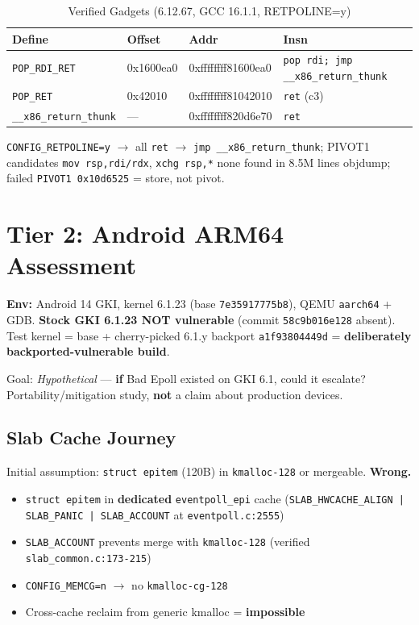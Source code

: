 \documentclass[11pt,a4paper]{article}
\begin{document}
\begin{table}[H]
\centering
\caption{Verified Gadgets (6.12.67, GCC 16.1.1, RETPOLINE=y)}
\begin{tabular}{llll}
\toprule
\textbf{Define} & \textbf{Offset} & \textbf{Addr} & \textbf{Insn} \\
\midrule
\texttt{POP\_RDI\_RET} & 0x1600ea0 & 0xffffffff81600ea0 & \texttt{pop rdi; jmp \_\_x86\_return\_thunk} \\
\texttt{POP\_RET} & 0x42010 & 0xffffffff81042010 & \texttt{ret} (c3) \\
\texttt{\_\_x86\_return\_thunk} & — & 0xffffffff820d6e70 & \texttt{ret} \\
\bottomrule
\end{tabular}
\end{table}
\texttt{CONFIG\_RETPOLINE=y} $\to$ all \texttt{ret} $\to$ \texttt{jmp \_\_x86\_return\_thunk}; PIVOT1 candidates \texttt{mov rsp,rdi/rdx}, \texttt{xchg rsp,*} none found in 8.5M lines objdump; failed \texttt{PIVOT1 0x10d6525} = store, not pivot.

\newpage

\section{Tier 2: Android ARM64 Assessment}

\textbf{Env:} Android 14 GKI, kernel 6.1.23 (base \texttt{7e35917775b8}), QEMU \texttt{aarch64} + GDB. \textbf{Stock GKI 6.1.23 NOT vulnerable} (commit \texttt{58c9b016e128} absent). Test kernel = base + cherry-picked 6.1.y backport \texttt{a1f93804449d} = \textbf{deliberately backported-vulnerable build}.

Goal: \textit{Hypothetical} --- \textbf{if} Bad Epoll existed on GKI 6.1, could it escalate? Portability/mitigation study, \textbf{not} a claim about production devices.

\subsection{Slab Cache Journey}

Initial assumption: \texttt{struct epitem} (120B) in \texttt{kmalloc-128} or mergeable. \textbf{Wrong.}

\begin{itemize}
  \item \texttt{struct epitem} in \textbf{dedicated} \texttt{eventpoll\_epi} cache (\texttt{SLAB\_HWCACHE\_ALIGN | SLAB\_PANIC | SLAB\_ACCOUNT} at \texttt{eventpoll.c:2555})
  \item \texttt{SLAB\_ACCOUNT} prevents merge with \texttt{kmalloc-128} (verified \texttt{slab\_common.c:173-215})
  \item \texttt{CONFIG\_MEMCG=n} $\to$ no \texttt{kmalloc-cg-128}
  \item Cross-cache reclaim from generic kmalloc = \textbf{impossible}
\end{itemize}
\end{document}
